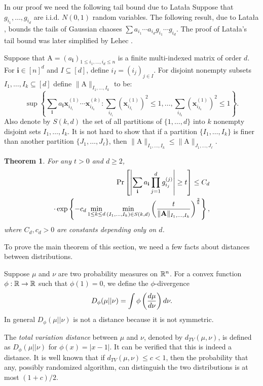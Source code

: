 \documentclass[11pt]{article}
\newcommand{\R}{\ensuremath\mathbb{R}}
\newcommand{\mb}{\mathbf}
\newtheorem{theorem}{Theorem}
\newcommand{\mat}[1]{{\ensuremath{\bm{\mathrm{#1}}}}}
\def\matA{\mat{A}}
\def\frac#1#2{{#1\over #2}}
\def\x{{\mathbf x}}
\begin{document}
In our proof we need the following tail bound due to Lata{\l}a
Suppose that $g_{i_1},\dots,g_{i_d}$ are i.i.d. $N(0,1)$ random variables. The following result, due to Lata\l{}a \cite{latala}, bounds the tails of Gaussian chaoses $\sum a_{i_1}\cdots a_{i_d}g_{i_1}\cdots g_{i_d}$. The proof of Lata\l{}a's tail bound was later simplified by Lehec \cite{Lehec}.

Suppose that $\matA = (a_{\mb{i}})_{1\leq i_1,\dots,i_d\leq n}$ is a finite multi-indexed matrix of order $d$. For $\mb{i}\in [n]^d$ and $I\subseteq [d]$, define $i_I = (i_j)_{j\in I}$. For disjoint nonempty subsets $I_1,\dots,I_k\subseteq [d]$ define $\|\matA\|_{I_1,\dots,I_k}$ to be:
\[\sup \left\{
	\sum_{\mb{i}} a_{\mb{i}} \x_{i_{I_1}}^{(1)}\cdots \x_{i_{I_k}}^{(k)}: \sum_{i_{I_1}} \left(\x_{i_{I_1}}^{(1)}\right)^2 \leq 1,\dots,
	\sum_{i_{I_k}} \left(\x_{i_{I_k}}^{(1)}\right)^2 \leq 1
\right\}.
\]
Also denote by $S(k,d)$ the set of all partitions of $\{1,\dots,d\}$ into $k$ nonempty disjoint sets $I_1,\dots,I_k$. It is not hard to
show that if a partition 
$\{I_1,\dots,I_k\}$ is finer than another partition $\{J_1,\dots,J_\ell\}$, 
then $\|\matA\|_{I_1,\dots,I_k}\leq \|\matA\|_{J_1,\dots,J_\ell}$.

\begin{theorem}\label{thm:latala}
For any $t > 0$ and $d\geq 2$,
\begin{eqnarray*}
\Pr\left [ \left| \sum_{\mb{i}} a_{\mb{i}} \prod_{j=1}^d g_{i_j}^{(j)} \right| \geq t \right ] \leq C_d\\
\cdot \exp\left\{ - c_d \min_{1\leq k\leq d} \min_{(I_1,\dots,I_k)\in S(k,d)} \left( \frac{t}{\|\matA\|_{I_1,\dots,I_k}}\right)^\frac{2}{k} \right\},
\end{eqnarray*}
where $C_d, c_d > 0$ are constants depending only on $d$.
\end{theorem}

To prove the main theorem of this section, we need a few facts about distances between distributions. 

Suppose $\mu$ and $\nu$ are two probability measures on $\R^n$. 
For a convex function $\phi:\R\to \R$ such that $\phi(1)=0$, we define the $\phi$-divergence
\[
D_\phi(\mu || \nu) = \int \phi\left(\frac{d\mu}{d\nu}\right)d\nu.
\]
In general $D_\phi(\mu||\nu)$ is not a distance because it is not symmetric. 

The \textit{total variation distance} between $\mu$ and $\nu$, denoted by $d_{TV}(\mu,\nu)$, 
is defined as $D_\phi(\mu||\nu)$ for $\phi(x) = |x-1|$. It can be verified that this is indeed a distance. It 
is well known that if $d_{TV}(\mu,\nu) \leq c < 1$, then the probability that any, possibly randomized
algorithm, can distinguish the two distributions is at most $(1+c)/2$. 
\end{document}
